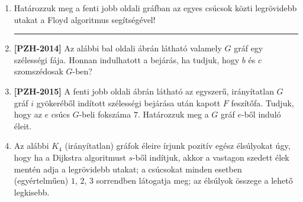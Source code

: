 \documentclass[a4paper,12pt]{article}
\begin{document}
\begin{enumerate}
        \item Határozzuk meg a fenti jobb oldali gráfban az egyes csúcsok közti legrövidebb utakat a Floyd algoritmus segítségével!
        
        \hrule

        \item \textbf{[PZH-2014]} Az alábbi bal oldali ábrán látható valamely $G$ gráf egy szélességi fája. Honnan indulhatott a bejárás, ha tudjuk, hogy $b$ és $c$ szomszédosak $G$-ben?
        
        \begin{minipage}{6in}
            \centering
            \raisebox{-0.5\height}{} \hspace{1in}
            \raisebox{-0.5\height}{}
        \end{minipage}
        
        \item \textbf{[PZH-2015]} A fenti jobb oldali ábrán látható az egyszerű, irányítatlan $G$ gráf $i$ gyökeréből indított szélességi bejárása után kapott $F$ feszítőfa. Tudjuk, hogy az $e$ csúcs $G$-beli fokszáma $7$. Határozzuk meg a $G$ gráf $e$-ből induló éleit.

        \item Az alábbi $K_4$ (irányítatlan) gráfok éleire írjunk pozitív egész élsúlyokat úgy, hogy ha a Dijkstra algoritmust $s$-ből indítjuk, akkor a vastagon szedett élek mentén adja a legrövidebb utakat; a csúcsokat minden esetben (egyértelműen) $1$, $2$, $3$ sorrendben látogatja meg; az élsúlyok összege a lehető legkisebb.
        \begin{figure}[h]
            \centering
            \begin{subfigure}{0.15\textwidth}
                \centering
                
            \end{subfigure}
            \begin{subfigure}{0.15\textwidth}
                \centering
                
            \end{subfigure}
            \begin{subfigure}{0.15\textwidth}
                \centering
                
            \end{subfigure}
            \begin{subfigure}{0.15\textwidth}
                \centering
                
            \end{subfigure}
            \begin{subfigure}{0.15\textwidth}
                \centering
                
            \end{subfigure}
            \begin{subfigure}{0.15\textwidth}
                \centering
                
            \end{subfigure}
        \end{figure}


\end{enumerate}
\end{document}
